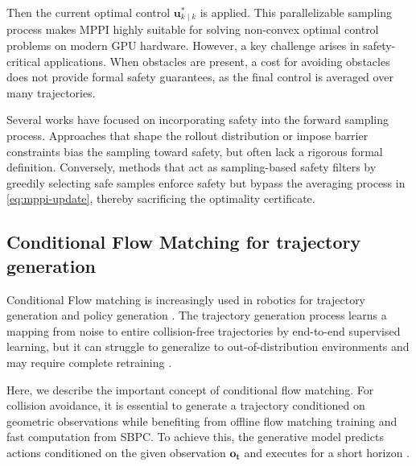 \documentclass[letterpaper, 10 pt, conference]{ieeeconf}
\begin{document}
Then the current optimal control $\mathbf{u}^*_{k\mid k}$ is applied. 
This parallelizable sampling process makes MPPI highly suitable for solving non-convex optimal control problems on modern GPU hardware. However, a key challenge arises in safety-critical applications. When obstacles are present, a cost for avoiding obstacles does not provide formal safety guarantees, as the final control is averaged over many trajectories. 

Several works have focused on incorporating safety into the forward sampling process. Approaches that shape the rollout distribution or impose barrier constraints \cite{yin2022,yin2023shield} bias the sampling toward safety, but often lack a rigorous formal definition. Conversely, methods that act as sampling-based safety filters by greedily selecting safe samples \cite{rabiee2024guaranteed} enforce safety but bypass the averaging process in \eqref{eq:mppi-update}, thereby sacrificing the optimality certificate.

\subsection{Conditional Flow Matching for trajectory generation}
Conditional Flow matching is increasingly used in robotics for trajectory generation and policy generation \cite{kurtz2025generative,mizuta2025unified}. The trajectory generation process learns a mapping from noise to entire collision-free trajectories by end-to-end supervised learning, but it can struggle to generalize to out-of-distribution environments and may require complete retraining \cite{ye2024efficient, dai2025safefm}. 

Here, we describe the important concept of conditional flow matching. For collision avoidance, it is essential to generate a trajectory conditioned on geometric observations while benefiting from offline flow matching training and fast computation from SBPC. To achieve this, the generative model predicts actions conditioned on the given observation $\mathbf{o_t}$ and executes for a short horizon \cite{chi2023diffusion}. 

\end{document}
